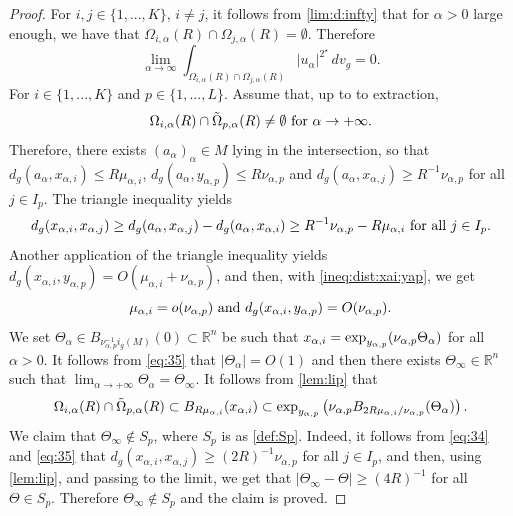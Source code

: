\documentclass[10pt,a4paper]{amsart}
\def \crit {2^\star}
\def \mai {\mu_{\alpha,i}}
\def \nap {\nu_{\alpha,p}}
\def \rn {\mathbb{R}^n}
\def \ua {u_\alpha}
\def \xai {x_{\alpha,i}}
\def \xaj {x_{\alpha,j}}
\def \yap {y_{\alpha,p}}
\begin{document}
\begin{proof}
\smallskip\noindent  For $i,j\in \{1,...,K\}$, $i\neq j$, it follows from \eqref{lim:d:infty} that for $\alpha>0$ large enough, we have that $\Omega_{i,\alpha}(R)\cap \Omega_{j,\alpha}(R)=\emptyset$. Therefore
\begin{equation}\label{lim:int:1}
\lim_{\alpha\to \infty}\int_{\Omega_{i,\alpha}(R)\cap \Omega_{j,\alpha}(R)}|\ua|^{\crit}\, dv_g=0.
\end{equation}
\smallskip\noindent For $i\in \{1,...,K\}$ and $p\in\{1,...,L\}$. Assume that, up to to extraction,
$$\Omega_{i,\alpha}(R)\cap \tilde{\Omega}_{p,\alpha}(R)\neq \emptyset\hbox{ for }\alpha\to +\infty.$$
Therefore, there exists $(a_\alpha)_\alpha\in M$ lying in the intersection, so that $d_g(a_\alpha, \xai)\leq R\mai$, $d_g(a_\alpha, \yap)\leq R\nap$ and $d_g(a_\alpha, \xaj)\geq R^{-1}\nap$ for all $j\in I_p$. The triangle inequality yields
\begin{equation}\label{eq:34}
d_g(\xai,\xaj)\geq d_g(a_\alpha,\xaj)-d_g(a_\alpha,\xai)\geq R^{-1}\nap-R\mai\hbox{ for all }j\in I_p.
\end{equation}
Another application of the triangle inequality yields $d_g(\xai,\yap)=O(\mai+\nap)$, and then, with  \eqref{ineq:dist:xai:yap}, we get 
\begin{equation}\label{eq:35}
\mai=o(\nap)\hbox{ and }d_g(\xai,\yap)=O(\nap).
\end{equation}
We set $\Theta_\alpha\in B_{\nap^{-1}i_g(M)}(0)\subset\rn$ be such that $\xai=\hbox{exp}_{\yap}(\nap \Theta_\alpha)$ for all $\alpha>0$. It follows from \eqref{eq:35} that $|\Theta_\alpha|=O(1)$ and then there exists $\Theta_\infty\in\rn$ such that $\lim_{\alpha\to +\infty}\Theta_\alpha=\Theta_\infty$. It follows from \eqref{lem:lip} that
$$\Omega_{i,\alpha}(R)\cap \tilde{\Omega}_{p,\alpha}(R)\subset B_{R\mai}(\xai)\subset \hbox{exp}_{\yap}\left(\nap B_{2R\mai/\nap}(\Theta_\alpha)\right).$$
We claim that $\Theta_\infty\not\in S_p$, where $S_p$ is as \eqref{def:Sp}. Indeed, it follows from  \eqref{eq:34} and \eqref{eq:35} that $d_g(\xai,\xaj)\geq (2R)^{-1}\nap$ for all $j\in I_p$, and then, using \eqref{lem:lip},  and passing to the limit, we get that $|\Theta_\infty-\Theta|\geq (4R)^{-1}$ for all $\Theta\in S_p$. Therefore $\Theta_\infty\not\in S_p$ and the claim is proved.


\end{proof}
\end{document}
